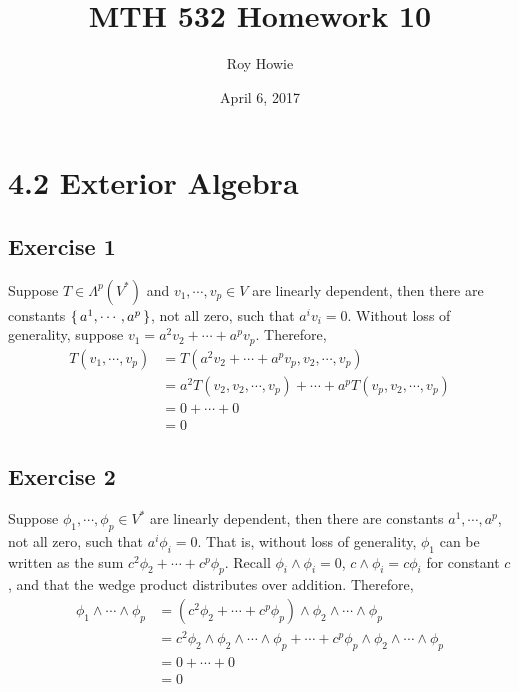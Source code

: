 \documentclass{article}
\begin{document}
\title{\vspace{-2cm}MTH 532 Homework 10}
\author{Roy Howie}
\date{April 6, 2017}
\maketitle

\section*{4.2 Exterior Algebra}
  \subsection*{Exercise 1}
    Suppose $T\in\Lambda^p(V^*)$ and $v_1,\cdots,v_p\in V$ are linearly
    dependent, then there are constants $\set{a^1,\cdots,a^p}$, not all zero,
    such that $a^iv_i=0$. Without loss of generality, suppose $v_1=a^2v_2+\cdots
    +a^pv_p$. Therefore,
    \begin{align*}
      T(v_1,\cdots,v_p)
        &= T(a^2v_2+\cdots+a^pv_p,v_2,\cdots,v_p)\\
        &= a^2T(v_2,v_2,\cdots,v_p)+\cdots+a^pT(v_p,v_2,\cdots,v_p)\\
        &= 0+\cdots+0\\
        &= 0\tag*{\qed}
    \end{align*}

  \subsection*{Exercise 2}
    Suppose $\phi_1,\cdots,\phi_p\in V^*$ are linearly dependent, then there are
    constants $a^1,\cdots,a^p$, not all zero, such that $a^i\phi_i=0$. That is,
    without loss of generality, $\phi_1$ can be written as the sum $c^2\phi_2+
    \cdots+c^p\phi_p$. Recall $\phi_i\wedge\phi_i=0$, $c\wedge\phi_i=c\phi_i$
    for constant $c$, and that the wedge product distributes over addition.
    Therefore,
    \begin{align*}
      \phi_1\wedge\cdots\wedge\phi_p
        &= (c^2\phi_2+\cdots+c^p\phi_p)\wedge\phi_2\wedge\cdots\wedge\phi_p\\
        &= c^2\phi_2\wedge\phi_2\wedge\cdots\wedge\phi_p
            +\cdots+
            c^p\phi_p\wedge\phi_2\wedge\cdots\wedge\phi_p\\
        &= 0+\cdots+0\\
        &= 0\tag*{\qed}
    \end{align*}
\end{document}
